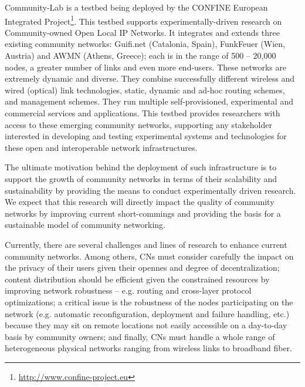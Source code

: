 \documentclass[conference]{IEEEtran}
\begin{document}
Community-Lab is a testbed being deployed by the CONFINE European
Integrated Project\footnote{\url{http://www.confine-project.eu}}. This testbed supports experimentally-driven research
on Community-owned Open Local IP Networks. It integrates and extends 
three existing community networks: Guifi.net (Catalonia, Spain),
FunkFeuer (Wien, Austria) and AWMN (Athens, Greece); each is in the
range of 500 -- 20,000 nodes, a greater number of links and even more end-users.
These networks are extremely dynamic and diverse. They combine
successfully different wireless and wired (optical) link technologies, static, dynamic
and ad-hoc routing schemes, and management schemes. They run multiple
self-provisioned, experimental and commercial services and applications.
This testbed provides researchers with access to these emerging
community networks, supporting any stakeholder interested in developing
and testing experimental systems and technologies for these open
and interoperable network infrastructures.


The ultimate motivation behind the deployment of such infrastructure is 
to support the growth of community networks in terms of their scalability and
sustainability by providing the means to conduct experimentally driven research. 
We expect that this research will directly impact the quality of community networks
by improving current short-commings and providing the basis for a sustainable
model of community networking.


Currently, there are several challenges and lines of research to enhance current
community networks. Among others, CNs must consider carefully the impact on the privacy of their
users given their opennes and degree of decentralization; content distribution 
should be efficient given the constrained resources by improving network robustness 
-- e.g. routing and cross-layer protocol optimizations; a critical issue is the
robustness of the nodes participating on the network (e.g. automatic reconfiguration,
deployment and failure handling, etc.) because they may sit on remote locations not
easily accessible on a day-to-day basis by community owners; and finally, CNs must handle a whole range
of heterogeneous physical networks ranging from wireless links to broadband fiber.
\end{document}
